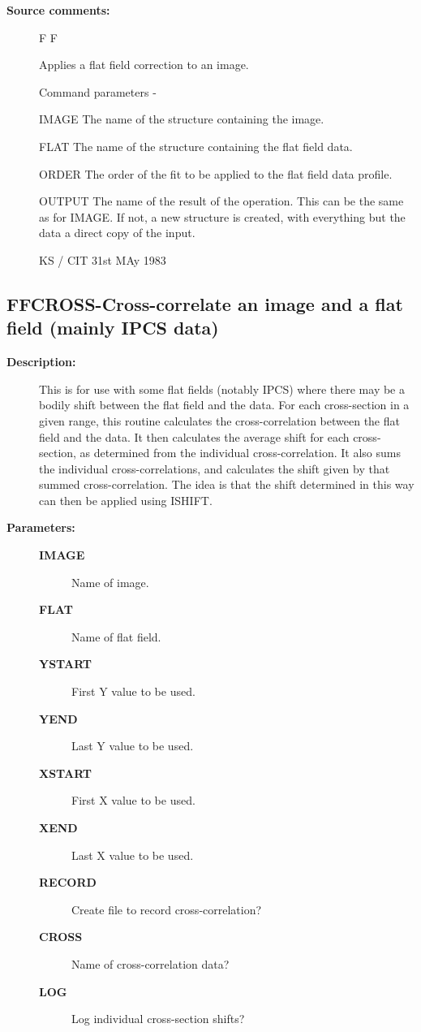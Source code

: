 \begin{description}
\begin{description}
\item [\textbf{Source comments:}]
\begin{terminalv}
 F F

 Applies a flat field correction to an image.

 Command parameters -

 IMAGE  The name of the structure containing the image.

 FLAT   The name of the structure containing the flat
        field data.

 ORDER  The order of the fit to be applied to the flat
        field data profile.

 OUTPUT The name of the result of the operation.  This can
        be the same as for IMAGE.  If not, a new structure
        is created, with everything but the data a direct
        copy of the input.

                                  KS / CIT 31st MAy 1983
\end{terminalv}
\end{description}
\subsection{FFCROSS-\label{FFCROSS}Cross-correlate an image and a flat field (mainly IPCS data)}
\begin{description}

\item [\textbf{Description:}]
 This is for use with some flat fields (notably IPCS) where
 there may be a bodily shift between the flat field and the data.
 For each cross-section in a given range, this routine calculates
 the cross-correlation between the flat field and the data. It then
 calculates the average shift for each cross-section, as determined
 from the individual cross-correlation.  It also sums the individual
 cross-correlations, and calculates the shift given by that summed
 cross-correlation.  The idea is that the shift determined in this
 way can then be applied using ISHIFT.

\item [\textbf{Parameters:}]
\begin{description}
\item [\textbf{IMAGE}]
 Name of image.
\item [\textbf{FLAT}]
 Name of flat field.
\item [\textbf{YSTART}]
 First Y value to be used.
\item [\textbf{YEND}]
 Last Y value to be used.
\item [\textbf{XSTART}]
 First X value to be used.
\item [\textbf{XEND}]
 Last X value to be used.
\item [\textbf{RECORD}]
 Create file to record cross-correlation?
\item [\textbf{CROSS}]
 Name of cross-correlation data?
\item [\textbf{LOG}]
 Log individual cross-section shifts?
\end{description}


\end{description}
\end{description}
